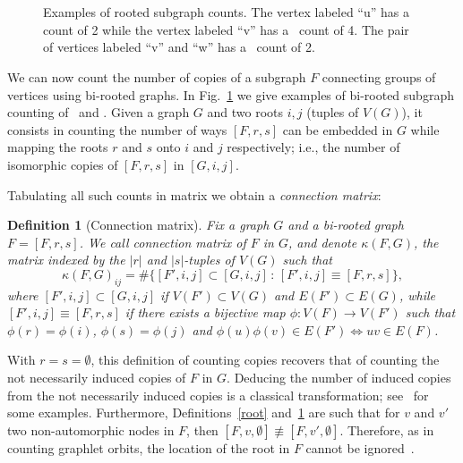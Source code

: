 \documentclass{article}
\theoremstyle{plain}
\newtheorem{Definition}{Definition}
\begin{document}
\begin{figure}
\centering\ 
\begin{minipage}[c]{0.52\textwidth}
        \caption{\label{CountingExample}
        Examples of rooted subgraph counts. The vertex labeled ``u'' has a \protect\TexttriangleR\,\! count of 2 while the vertex labeled ``v'' has a \protect\TexttriangleR\,\! count of 4. The pair of vertices labeled ``v'' and ``w'' has a \protect\TexttriangleRR\,\! count of 2.}
\end{minipage}\hfill
\begin{minipage}[c]{0.45\textwidth}\centering
        \FigGraph
\end{minipage}
\ \vspace{.4\baselineskip}\\
{\centering{
\hfill{\Huge{--------------------------------------------}}\hfill}}
\vspace{-\baselineskip}
\end{figure}

We can now count the number of copies of a subgraph $F$ connecting groups of vertices using bi-rooted graphs. In Fig.~\ref{CountingExample} we give examples of bi-rooted subgraph counting of \TexttriangleR\,\! and \TexttriangleRR\nobreak\hspace{.001em plus .01em}. Given a graph $G$ and two roots $i,j$ (tuples of $V(G)$), it consists in counting the number of ways $[F,r,s]$ can be embedded in $G$ while mapping the roots $r$ and $s$ onto $i$ and $j$ respectively; i.e., the number of isomorphic copies of $[F,r,s]$ in $[G,i,j]$.

Tabulating all such counts in matrix we obtain a {\em connection matrix}:
\begin{Definition}[Connection matrix]\label{count}
\vspace{-.25\baselineskip}
Fix a graph $G$ and a bi-rooted graph $F=[F,r,s]$. We call connection matrix of $F$ in $G$, and denote $\kappa(F,G)$, the matrix indexed by the $|r|$ and $|s|$-tuples of $V(G)$ such that
\[
\kappa(F,G)_{ij}= \#\big\{[F',i,j]\subset [G,i,j]\,:\,[F',i,j]\equiv [F,r,s]\big\},
\]
where $[F',i,j]\subset [G,i,j]$ if $V(F')\subset V(G)$ and $E(F')\subset E(G)$, while $[F',i,j]\equiv [F,r,s]$ if there exists a bijective map $\phi:V(F)\to V(F')$ such that $\phi(r)=\phi(i)$, $\phi(s)=\phi(j)$ and $\phi(u)\phi(v)\in E(F') \Leftrightarrow uv\in E(F)$.\vspace{-.33\baselineskip}
\end{Definition}
With $r=s=\emptyset$, this definition of counting copies recovers that of counting the not necessarily induced copies of $F$ in $G$. Deducing the number of induced copies from the not necessarily induced copies is a classical transformation; see~\cite{marcus2010efficient,jha2015path,kowaluk2013counting} for some examples. Furthermore, Definitions~\ref{root} and~\ref{count} are such that for $v$ and $v'$ two non-automorphic nodes in $F$, then $[F,v,\emptyset]\not\equiv[F,v',\emptyset]$. Therefore, as in counting graphlet orbits, the location of the root in $F$ cannot be ignored~\cite{Przulj2007}.
\end{document}

